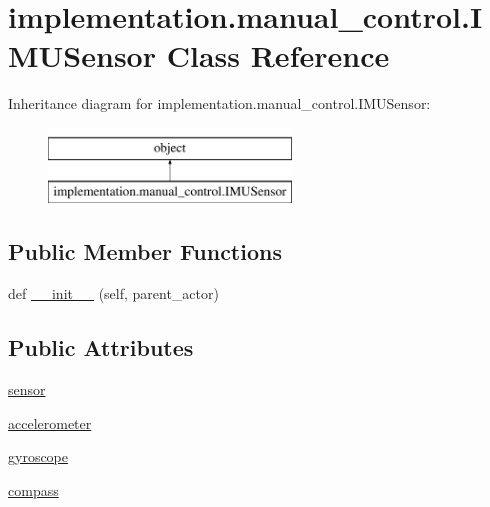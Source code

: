 \hypertarget{classimplementation_1_1manual__control_1_1_i_m_u_sensor}{}\section{implementation.\+manual\+\_\+control.\+I\+M\+U\+Sensor Class Reference}
\label{classimplementation_1_1manual__control_1_1_i_m_u_sensor}
Inheritance diagram for implementation.\+manual\+\_\+control.\+I\+M\+U\+Sensor\+:\begin{figure}[H]
\begin{center}
\leavevmode
\includegraphics[height=2.000000cm]{classimplementation_1_1manual__control_1_1_i_m_u_sensor}
\end{center}
\end{figure}
\subsection*{Public Member Functions}
\begin{DoxyCompactItemize}
\item 
def \hyperlink{classimplementation_1_1manual__control_1_1_i_m_u_sensor_a08519b07c706defc81db7bf62887534d}{\+\_\+\+\_\+init\+\_\+\+\_\+} (self, parent\+\_\+actor)
\end{DoxyCompactItemize}
\subsection*{Public Attributes}
\begin{DoxyCompactItemize}
\item 
\hyperlink{classimplementation_1_1manual__control_1_1_i_m_u_sensor_a0c0695278644bcb85488a371a6e5658c}{sensor}
\item 
\hyperlink{classimplementation_1_1manual__control_1_1_i_m_u_sensor_a578bd537303fe8a99c4047982519ea45}{accelerometer}
\item 
\hyperlink{classimplementation_1_1manual__control_1_1_i_m_u_sensor_a9f9e117d6935ed897d8ab058112adb90}{gyroscope}
\item 
\hyperlink{classimplementation_1_1manual__control_1_1_i_m_u_sensor_ac822546a1d64677ffcd5ceeb9b4033d5}{compass}
\end{DoxyCompactItemize}


